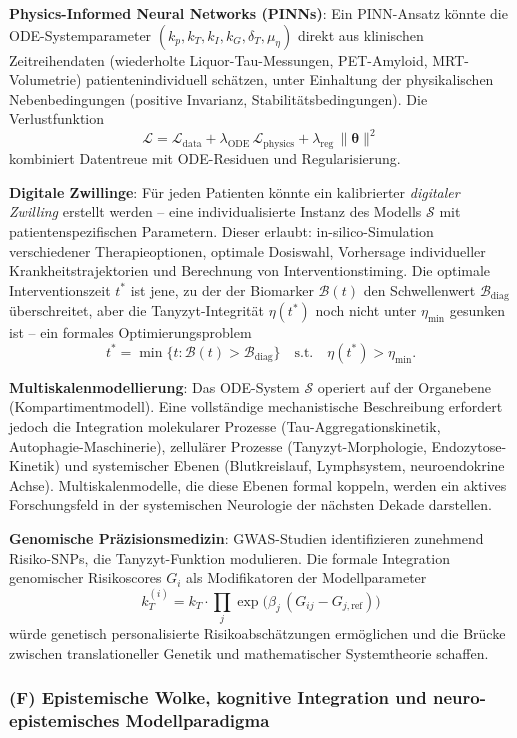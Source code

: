 ﻿\documentclass[12pt,a4paper]{article}
\theoremstyle{definition}
\begin{document}
	\textbf{Physics-Informed Neural Networks (PINNs)}: Ein PINN-Ansatz könnte die ODE-Systemparameter $(k_p, k_T, k_I, k_G, \delta_T, \mu_\eta)$ direkt aus klinischen Zeitreihendaten (wiederholte Liquor-Tau-Messungen, PET-Amyloid, MRT-Volumetrie) patientenindividuell schätzen, unter Einhaltung der physikalischen Nebenbedingungen (positive Invarianz, Stabilitätsbedingungen). Die Verlustfunktion
	\[
	\mathcal{L} = \mathcal{L}_{\text{data}} + \lambda_{\text{ODE}}\,\mathcal{L}_{\text{physics}} + \lambda_{\text{reg}}\,\|\boldsymbol{\theta}\|^2
	\]
	kombiniert Datentreue mit ODE-Residuen und Regularisierung.

	\textbf{Digitale Zwillinge}: Für jeden Patienten könnte ein kalibrierter \emph{digitaler Zwilling} erstellt werden -- eine individualisierte Instanz des Modells $\mathcal{S}$ mit patientenspezifischen Parametern. Dieser erlaubt: in-silico-Simulation verschiedener Therapieoptionen, optimale Dosiswahl, Vorhersage individueller Krankheitstrajektorien und Berechnung von Interventionstiming. Die optimale Interventionszeit $t^*$ ist jene, zu der der Biomarker $\mathcal{B}(t)$ den Schwellenwert $\mathcal{B}_{\text{diag}}$ überschreitet, aber die Tanyzyt-Integrität $\eta(t^*)$ noch nicht unter $\eta_{\min}$ gesunken ist -- ein formales Optimierungsproblem
	\[
	t^* = \min\bigl\{t : \mathcal{B}(t) > \mathcal{B}_{\text{diag}}\bigr\} \quad \text{s.t.} \quad \eta(t^*) > \eta_{\min}.
	\]

	\textbf{Multiskalenmodellierung}: Das ODE-System $\mathcal{S}$ operiert auf der Organebene (Kompartimentmodell). Eine vollständige mechanistische Beschreibung erfordert jedoch die Integration molekularer Prozesse (Tau-Aggregationskinetik, Autophagie-Maschinerie), zellulärer Prozesse (Tanyzyt-Morphologie, Endozytose-Kinetik) und systemischer Ebenen (Blutkreislauf, Lymphsystem, neuroendokrine Achse). Multiskalenmodelle, die diese Ebenen formal koppeln, werden ein aktives Forschungsfeld in der systemischen Neurologie der nächsten Dekade darstellen.

	\textbf{Genomische Präzisionsmedizin}: GWAS-Studien identifizieren zunehmend Risiko-SNPs, die Tanyzyt-Funktion modulieren. Die formale Integration genomischer Risikoscores $G_i$ als Modifikatoren der Modellparameter
	\[
	k_T^{(i)} = k_T \cdot \prod_j \exp\!\bigl(\beta_j\,(G_{ij} - G_{j,\text{ref}})\bigr)
	\]
	würde genetisch personalisierte Risikoabschätzungen ermöglichen und die Brücke zwischen translationeller Genetik und mathematischer Systemtheorie schaffen.

	\subsubsection*{(F) Epistemische Wolke, kognitive Integration und neuro-epistemisches Modellparadigma}
\end{document}
